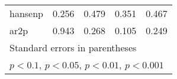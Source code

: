{\begin{tabular}{l*{4}{c}}
hansenp             &       0.256         &       0.479         &       0.351         &       0.467         \\
ar2p                &       0.943         &       0.268         &       0.105         &       0.249         \\
\hline\hline
\multicolumn{5}{l}{\footnotesize Standard errors in parentheses}\\
\multicolumn{5}{l}{\footnotesize \sym{+} \(p<0.1\), \sym{*} \(p<0.05\), \sym{**} \(p<0.01\), \sym{***} \(p<0.001\)}\\
\end{tabular}
}
